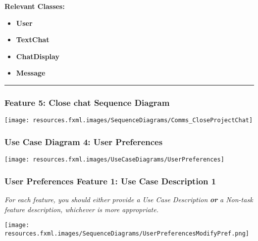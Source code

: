 \documentclass[twoside,letterpaper]{article}
\begin{document}
\noindent\textbf{Relevant Classes:}
\begin{itemize}
	\item \textbf{User}
	\item \textbf{TextChat}
	\item \textbf{ChatDisplay}
	\item \textbf{Message}
\end{itemize}
\hrule
\newpage

\subsubsection[Communication Feature 5: Close chat Sequence Diagram]{\rmfamily\bfseries\color{black}
	Feature 5: Close chat Sequence Diagram}
\hypertarget{RefHeading22059017292}{}

\bigskip

\texttt{[image: resources.fxml.images/SequenceDiagrams/Comms\_CloseProjectChat]}

\newpage

\subsubsection[Use Case Diagram 4: User Preferences]{\rmfamily\bfseries\color{black}
	Use Case Diagram 4: User Preferences}

\bigskip

\texttt{[image: resources.fxml.images/UseCaseDiagrams/UserPreferences]}

\newpage

\subsubsection[User Preferences Feature 1: Use Case Description 1]{\rmfamily\bfseries\color{black}
	User Preferences Feature 1: Use Case Description 1}
\hypertarget{RefHeading22059017292}{}
\bigskip

{\color{black}
	\foreignlanguage{english}{\textit{For each feature, you should either provide a Use Case Description
		}}\foreignlanguage{english}{\textbf{\textit{or}}}\foreignlanguage{english}{\textit{ a Non-task feature description,
		whichever is more appropriate.}}}

\texttt{[image: resources.fxml.images/SequenceDiagrams/UserPreferencesModifyPref.png]}

\newpage
\end{document}
